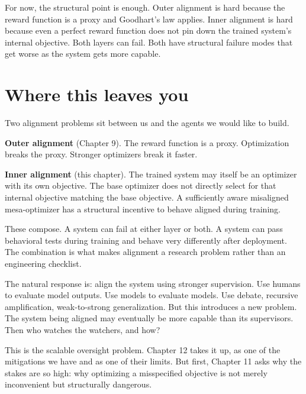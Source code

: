For now, the structural point is enough. Outer alignment is hard because the reward function is a proxy and Goodhart's law applies. Inner alignment is hard because even a perfect reward function does not pin down the trained system's internal objective. Both layers can fail. Both have structural failure modes that get worse as the system gets more capable.

\section*{Where this leaves you}

Two alignment problems sit between us and the agents we would like to build.

\textbf{Outer alignment} (Chapter 9). The reward function is a proxy. Optimization breaks the proxy. Stronger optimizers break it faster.

\textbf{Inner alignment} (this chapter). The trained system may itself be an optimizer with its own objective. The base optimizer does not directly select for that internal objective matching the base objective. A sufficiently aware misaligned mesa-optimizer has a structural incentive to behave aligned during training.

These compose. A system can fail at either layer or both. A system can pass behavioral tests during training and behave very differently after deployment. The combination is what makes alignment a research problem rather than an engineering checklist.

The natural response is: align the system using stronger supervision. Use humans to evaluate model outputs. Use models to evaluate models. Use debate, recursive amplification, weak-to-strong generalization. But this introduces a new problem. The system being aligned may eventually be more capable than its supervisors. Then who watches the watchers, and how?

This is the scalable oversight problem. Chapter 12 takes it up, as one of the mitigations we have and as one of their limits. But first, Chapter 11 asks why the stakes are so high: why optimizing a misspecified objective is not merely inconvenient but structurally dangerous.
